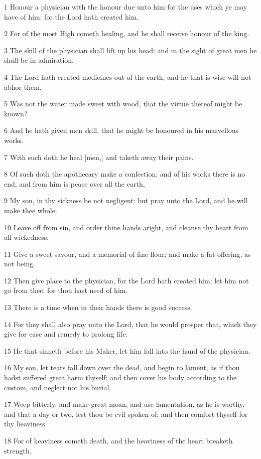 \par 1 Honour a physician with the honour due unto him for the uses which ye may have of him: for the Lord hath created him.
\par 2 For of the most High cometh healing, and he shall receive honour of the king.
\par 3 The skill of the physician shall lift up his head: and in the sight of great men he shall be in admiration.
\par 4 The Lord hath created medicines out of the earth; and he that is wise will not abhor them.
\par 5 Was not the water made sweet with wood, that the virtue thereof might be known?
\par 6 And he hath given men skill, that he might be honoured in his marvellous works.
\par 7 With such doth he heal [men,] and taketh away their pains.
\par 8 Of such doth the apothecary make a confection; and of his works there is no end; and from him is peace over all the earth,
\par 9 My son, in thy sickness be not negligent: but pray unto the Lord, and he will make thee whole.
\par 10 Leave off from sin, and order thine hands aright, and cleanse thy heart from all wickedness.
\par 11 Give a sweet savour, and a memorial of fine flour; and make a fat offering, as not being.
\par 12 Then give place to the physician, for the Lord hath created him: let him not go from thee, for thou hast need of him.
\par 13 There is a time when in their hands there is good success.
\par 14 For they shall also pray unto the Lord, that he would prosper that, which they give for ease and remedy to prolong life.
\par 15 He that sinneth before his Maker, let him fall into the hand of the physician.
\par 16 My son, let tears fall down over the dead, and begin to lament, as if thou hadst suffered great harm thyself; and then cover his body according to the custom, and neglect not his burial.
\par 17 Weep bitterly, and make great moan, and use lamentation, as he is worthy, and that a day or two, lest thou be evil spoken of: and then comfort thyself for thy heaviness.
\par 18 For of heaviness cometh death, and the heaviness of the heart breaketh strength.
